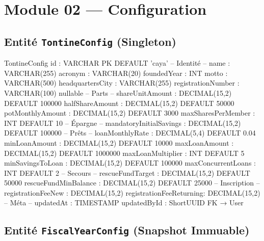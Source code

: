 \documentclass[12pt, a4paper]{report}
\begin{document}
\section{Module 02 — Configuration}

\subsection{Entité \texttt{TontineConfig} (Singleton)}

\begin{codeBox}
TontineConfig {
  id                      : VARCHAR    PK DEFAULT 'caya'
  -- Identité --
  name                    : VARCHAR(255)
  acronym                 : VARCHAR(20)
  foundedYear             : INT
  motto                   : VARCHAR(500)
  headquartersCity        : VARCHAR(255)
  registrationNumber      : VARCHAR(100)  nullable
  -- Parts --
  shareUnitAmount         : DECIMAL(15,2)  DEFAULT 100000
  halfShareAmount         : DECIMAL(15,2)  DEFAULT 50000
  potMonthlyAmount        : DECIMAL(15,2)  DEFAULT 3000
  maxSharesPerMember      : INT            DEFAULT 10
  -- Épargne --
  mandatoryInitialSavings : DECIMAL(15,2)  DEFAULT 100000
  -- Prêts --
  loanMonthlyRate         : DECIMAL(5,4)   DEFAULT 0.04
  minLoanAmount           : DECIMAL(15,2)  DEFAULT 10000
  maxLoanAmount           : DECIMAL(15,2)  DEFAULT 1000000
  maxLoanMultiplier       : INT            DEFAULT 5
  minSavingsToLoan        : DECIMAL(15,2)  DEFAULT 100000
  maxConcurrentLoans      : INT            DEFAULT 2
  -- Secours --
  rescueFundTarget        : DECIMAL(15,2)  DEFAULT 50000
  rescueFundMinBalance    : DECIMAL(15,2)  DEFAULT 25000
  -- Inscription --
  registrationFeeNew      : DECIMAL(15,2)
  registrationFeeReturning: DECIMAL(15,2)
  -- Méta --
  updatedAt               : TIMESTAMP
  updatedById             : ShortUUID FK → User
}
\end{codeBox}

\subsection{Entité \texttt{FiscalYearConfig} (Snapshot Immuable)}
\end{document}

